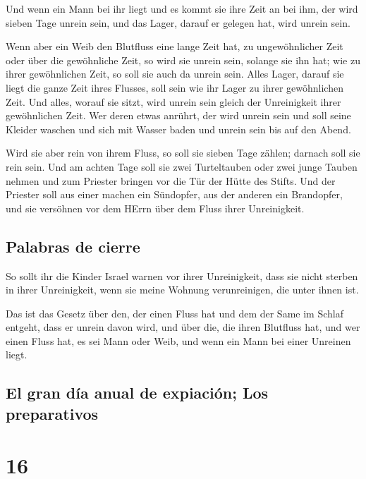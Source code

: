  Und wenn ein Mann bei ihr liegt und es kommt sie ihre
Zeit an bei ihm, der wird sieben Tage unrein sein, und das Lager, darauf
er gelegen hat, wird unrein sein.

 Wenn aber ein Weib den Blutfluss eine lange Zeit hat, zu
ungewöhnlicher Zeit oder über die gewöhnliche Zeit, so wird sie unrein
sein, solange sie ihn hat; wie zu ihrer gewöhnlichen Zeit, so soll sie
auch da unrein sein.  Alles Lager, darauf sie liegt die
ganze Zeit ihres Flusses, soll sein wie ihr Lager zu ihrer gewöhnlichen
Zeit. Und alles, worauf sie sitzt, wird unrein sein gleich der
Unreinigkeit ihrer gewöhnlichen Zeit.  Wer deren etwas
anrührt, der wird unrein sein und soll seine Kleider waschen und sich
mit Wasser baden und unrein sein bis auf den Abend.

 Wird sie aber rein von ihrem Fluss, so soll sie sieben
Tage zählen; darnach soll sie rein sein.  Und am achten
Tage soll sie zwei Turteltauben oder zwei junge Tauben nehmen und zum
Priester bringen vor die Tür der Hütte des Stifts.  Und
der Priester soll aus einer machen ein Sündopfer, aus der anderen ein
Brandopfer, und sie versöhnen vor dem HErrn über dem Fluss ihrer
Unreinigkeit.

\hypertarget{palabras-de-cierre}{%
\subsection{Palabras de cierre}\label{palabras-de-cierre}}

 So sollt ihr die Kinder Israel warnen vor ihrer
Unreinigkeit, dass sie nicht sterben in ihrer Unreinigkeit, wenn sie
meine Wohnung verunreinigen, die unter ihnen ist.

 Das ist das Gesetz über den, der einen Fluss hat und dem
der Same im Schlaf entgeht, dass er unrein davon wird, 
und über die, die ihren Blutfluss hat, und wer einen Fluss hat, es sei
Mann oder Weib, und wenn ein Mann bei einer Unreinen liegt.

\hypertarget{el-gran-duxeda-anual-de-expiaciuxf3n-los-preparativos}{%
\subsection{El gran día anual de expiación; Los
preparativos}\label{el-gran-duxeda-anual-de-expiaciuxf3n-los-preparativos}}

\hypertarget{section-15}{%
\section{16}\label{section-15}}

